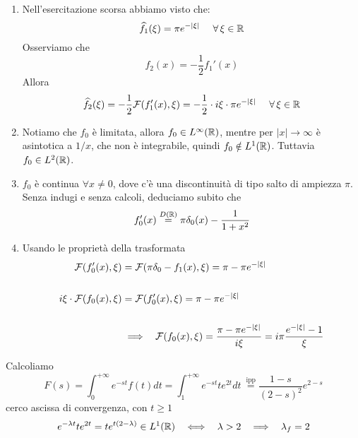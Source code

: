 \begin{enumerate}
\item Nell'esercitazione scorsa abbiamo visto che:\begin{equation*}
\hat{f}_{1}(\xi) = \pi e^{ - | \xi | } \ \ \ \ \forall \xi \in \RR 
\end{equation*}Osserviamo che\begin{equation*}
f_{2}(x) = - \frac{1}{2} f_{1} '(x)
\end{equation*}Allora\begin{equation*}
\hat{f}_{2}(\xi) = - \frac{1}{2}\Fc (f_{1} '(x) ,\xi) = - \frac{1}{2} \cdot i\xi \cdot \pi e^{ - | \xi | } \ \ \ \ \forall \xi \in \RR 
\end{equation*}
\item Notiamo che $f_{0}$ è limitata, allora $f_{0} \in L^{\infty }(\mathbb{R})$, mentre per $| x| \rightarrow \infty $ è asintotica a $1/x$, che non è integrabile, quindi $f_{0} \notin L^{1}(\mathbb{R})$. Tuttavia $f_{0} \in L^{2}(\mathbb{R})$.
\item $f_{0}$ è continua $\forall x\neq 0$, dove c'è una discontinuità di tipo salto di ampiezza $\pi $. Senza indugi e senza calcoli, deduciamo subito che\begin{equation*}
f_{0} '(x)\overset{D(\mathbb{R})}{ = } \pi \delta _{0}(x) - \frac{1}{1 + x^{2}}
\end{equation*}
\item Usando le proprietà della trasformata\begin{align*}
\mathcal{F} (f_{0} '(x) ,\xi) & = \mathcal{F} (\pi \delta _{0} - f_{1}(x) ,\xi) = \pi - \pi e^{ - | \xi | }\\
 & \\
i\xi \cdot\mathcal{F} (f_{0}(x) ,\xi) & = \mathcal{F} (f_{0} '(x) ,\xi) = \pi - \pi e^{ - | \xi | }\\
 & \\
 & \implies \ \ \mathcal{F} (f_{0}(x) ,\xi) = \frac{\pi - \pi e^{ - | \xi | }}{i\xi } = i\pi \frac{e^{ - | \xi | } - 1}{\xi }
\end{align*}
\end{enumerate}
\Soluzione

Calcoliamo
\begin{equation*}
F(s) = \int ^{ + \infty }_{0} e^{ - st} f(t) dt = \int ^{ + \infty }_{1} e^{ - st} te^{2t} dt\ \overset{\text{ipp}}{ = }\frac{1 - s}{(2 - s)^{2}} e^{2 - s}
\end{equation*}
cerco ascissa di convergenza, con $t\geq 1$
\begin{equation*}
e^{ - \lambda t} te^{2t} = te^{t(2 - \lambda)} \in L^{1}(\RR) \ \ \iff \ \ \lambda  > 2\ \ \implies \ \ \lambda _{f} = 2
\end{equation*}
\Soluzione

